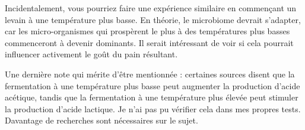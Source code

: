 Incidentalement, vous pourriez faire une expérience similaire en commençant un levain à une température plus basse. En théorie, le microbiome devrait s'adapter, car les micro-organismes qui prospèrent le plus à des températures plus basses commenceront à devenir dominants. Il serait intéressant de voir si cela pourrait influencer activement le goût du pain résultant.

Une dernière note qui mérite d'être mentionnée : certaines sources disent que la fermentation à une température plus basse peut augmenter la production d'acide acétique, tandis que la fermentation à une température plus élevée peut stimuler la production d'acide lactique. Je n'ai pas pu vérifier cela dans mes propres tests. Davantage de recherches sont nécessaires sur le sujet.